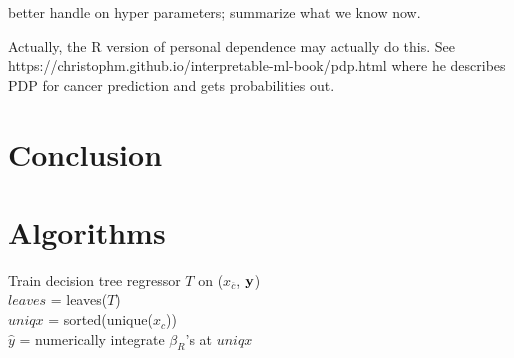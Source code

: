 \documentclass[12pt]{article}
\newcommand{\xnc}{$x_{\overline{c}}$}
\begin{document}
better handle on hyper parameters; summarize what we know now.

Actually, the R version of personal dependence may actually do this. See https://christophm.github.io/interpretable-ml-book/pdp.html where he describes PDP for cancer prediction and gets probabilities out.

\section{Conclusion}
\label{sec:conc}

\section{Algorithms}

\setlength{\algomargin}{5pt}
\begin{algorithm}[H]
\label{alg:StratPD}
\LinesNumbered
{}
\SetAlgoSkip{}
\SetInd{.5em}{.5em}
Train decision tree regressor $T$ on (\xnc{}, $\bf y$)\\
$leaves$ = leaves($T$)\\
$uniqx$ = sorted(unique($x_c$))\\
$\hat{y}$ = numerically integrate $\beta_R$'s at $uniqx$\\
\end{algorithm}
\end{document}
